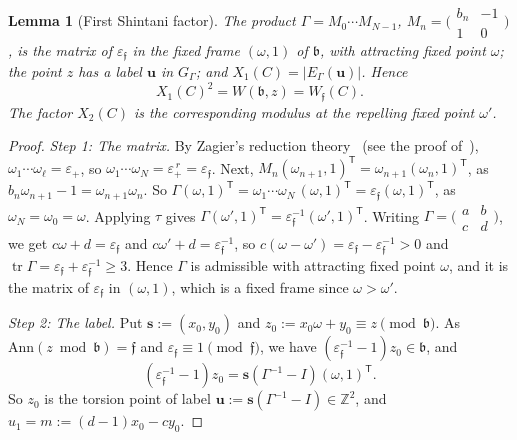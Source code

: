\documentclass[11pt]{amsart}
\numberwithin{equation}{section}
\theoremstyle{plain}
\newtheorem{lemma}[theorem]{Lemma}
\theoremstyle{definition}
\theoremstyle{remark}
\begin{document}
\begin{lemma}[First Shintani factor]\label{lem:shintani1}
The product \(\Gamma=M_0\cdots M_{N-1}\), \(M_n=\bigl(\begin{smallmatrix}b_n&-1\\1&0\end{smallmatrix}\bigr)\), is the matrix of \(\varepsilon_{\mathfrak f}\) in the fixed frame \((\omega,1)\) of \(\mathfrak b\), with attracting fixed point \(\omega\); the point \(z\) has a label \(\mathbf u\) in \(G_\Gamma\); and \(X_1(C)=|E_\Gamma(\mathbf u)|\). Hence
\[X_1(C)^2=W(\mathfrak b,z)=W_{\mathfrak f}(C).\]
The factor \(X_2(C)\) is the corresponding modulus at the repelling fixed point \(\omega'\).
\end{lemma}

\begin{proof}
\emph{Step 1: The matrix.} By Zagier's reduction theory~\cite{Zag75} (see the proof of~\cite[Lemma~2.1.3]{Ya08}), \(\omega_1\cdots\omega_\ell=\varepsilon_+\), so \(\omega_1\cdots\omega_N=\varepsilon_+^{\,r}=\varepsilon_{\mathfrak f}\). Next, \(M_n(\omega_{n+1},1)^{\mathsf T}=\omega_{n+1}(\omega_n,1)^{\mathsf T}\), as \(b_n\omega_{n+1}-1=\omega_{n+1}\omega_n\). So \(\Gamma(\omega,1)^{\mathsf T}=\omega_1\cdots\omega_N\,(\omega,1)^{\mathsf T}=\varepsilon_{\mathfrak f}(\omega,1)^{\mathsf T}\), as \(\omega_N=\omega_0=\omega\). Applying \(\tau\) gives \(\Gamma(\omega',1)^{\mathsf T}=\varepsilon_{\mathfrak f}^{-1}(\omega',1)^{\mathsf T}\). Writing \(\Gamma=\bigl(\begin{smallmatrix}a&b\\c&d\end{smallmatrix}\bigr)\), we get \(c\omega+d=\varepsilon_{\mathfrak f}\) and \(c\omega'+d=\varepsilon_{\mathfrak f}^{-1}\), so \(c(\omega-\omega')=\varepsilon_{\mathfrak f}-\varepsilon_{\mathfrak f}^{-1}>0\) and \(\operatorname{tr}\Gamma=\varepsilon_{\mathfrak f}+\varepsilon_{\mathfrak f}^{-1}\ge3\). Hence \(\Gamma\) is admissible with attracting fixed point \(\omega\), and it is the matrix of \(\varepsilon_{\mathfrak f}\) in \((\omega,1)\), which is a fixed frame since \(\omega>\omega'\).

\emph{Step 2: The label.} Put \(\mathbf s:=(x_0,y_0)\) and \(z_0:=x_0\omega+y_0\equiv z\pmod{\mathfrak b}\). As \(\mathrm{Ann}(z\bmod\mathfrak b)=\mathfrak f\) and \(\varepsilon_{\mathfrak f}\equiv1\pmod{\mathfrak f}\), we have \((\varepsilon_{\mathfrak f}^{-1}-1)z_0\in\mathfrak b\), and
\[(\varepsilon_{\mathfrak f}^{-1}-1)z_0=\mathbf s(\Gamma^{-1}-I)(\omega,1)^{\mathsf T}.\]
So \(z_0\) is the torsion point of label \(\mathbf u:=\mathbf s(\Gamma^{-1}-I)\in\mathbb Z^2\), and \(u_1=m:=(d-1)x_0-cy_0\).


\end{proof}
\end{document}
